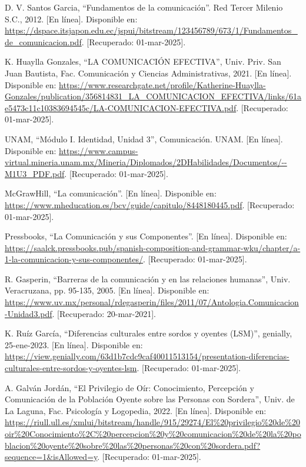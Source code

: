 \begin{thebibliography}{200}
    D. V. Santos Garcia, “Fundamentos de la comunicación”. Red Tercer Milenio S.C., 2012. [En línea]. Disponible en: \url{https://dspace.itsjapon.edu.ec/jspui/bitstream/123456789/673/1/Fundamentos_de_comunicacion.pdf}. [Recuperado: 01-mar-2025].

    K. Huaylla Gonzales, “LA COMUNICACIÓN EFECTIVA”, Univ. Priv. San Juan Bautista, Fac. Comunicación y Ciencias Administrativas, 2021. [En línea]. Disponible en: \url{https://www.researchgate.net/profile/Katherine-Huaylla-Gonzales/publication/356814831_LA_COMUNICACION_EFECTIVA/links/61ae5473c11c10383694545c/LA-COMUNICACION-EFECTIVA.pdf}. [Recuperado: 01-mar-2025].

    UNAM, “Módulo I. Identidad, Unidad 3”, Comunicación. UNAM. [En línea]. Disponible en: \url{https://www.campus-virtual.mineria.unam.mx/Mineria/Diplomados/2DHabilidades/Documentos/--M1U3_PDF.pdf}. [Recuperado: 01-mar-2025].

    McGrawHill, “La comunicación”. [En línea]. Disponible en: \url{https://www.mheducation.es/bcv/guide/capitulo/8448180445.pdf}. [Recuperado: 01-mar-2025].

    Pressbooks, “La Comunicación y sus Componentes”. [En línea]. Disponible en: \url{https://saalck.pressbooks.pub/spanish-composition-and-grammar-wku/chapter/a-1-la-comunicacion-y-sus-componentes/}. [Recuperado: 01-mar-2025].

    R. Gasperin, “Barreras de la comunicación y en las relaciones humanas”, Univ. Veracruzana, pp. 95-135, 2005. [En línea]. Disponible en: \url{https://www.uv.mx/personal/rdegasperin/files/2011/07/Antologia.Comunicacion-Unidad3.pdf}. [Recuperado: 20-mar-2021].

    K. Ruíz García, “Diferencias culturales entre sordos y oyentes (LSM)”, genially, 25-ene-2023. [En línea]. Disponible en: \url{https://view.genially.com/63d1b7cdc9caf40011513154/presentation-diferencias-culturales-entre-sordos-y-oyentes-lsm}. [Recuperado: 01-mar-2025].

    A. Galván Jordán, “El Privilegio de Oír: Conocimiento, Percepción y Comunicación de la Población Oyente sobre las Personas con Sordera”, Univ. de La Laguna, Fac. Psicología y Logopedia, 2022. [En línea]. Disponible en: \url{https://riull.ull.es/xmlui/bitstream/handle/915/29274/El%20privilegio%20de%20oir%20Conocimiento%2C%20percepcion%20y%20comunicacion%20de%20la%20poblacion%20oyente%20sobre%20las%20personas%20con%20sordera.pdf?sequence=1&isAllowed=y}. [Recuperado: 01-mar-2025].


\end{thebibliography}
